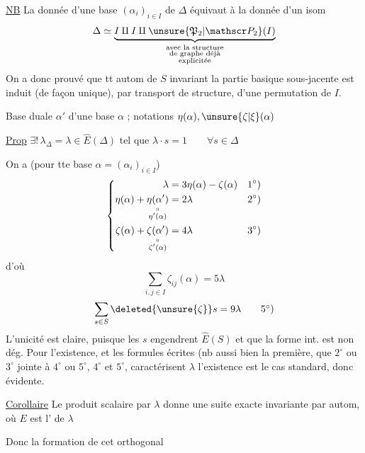 \uline{NB} La donnée d'une base $(\alpha_i)_{i\in I}$ de $\Delta$ équivaut à la donnée d'un isom
\[
\Delta\simeq\underbrace{I\amalg I\amalg\unsure{\mathfrak P_2|\mathscr P_2}(I)}_{\substack{\text{avec la structure}\\\text{de graphe déjà}\\\text{explicitée}}}
\]
On a donc prouvé que tt autom de $S$ invariant  la partie basique sous-jacente est induit (de façon unique), par  transport de structure, d'une permutation de $I$.

Base duale $\alpha'$ d'une base $\alpha$ ; notations $\eta(\alpha),\unsure{\zeta|\xi}(\alpha)$

\uline{Prop} $\exists!\,\lambda_\Delta=\lambda\in\widehat E(\Delta)$ tel que $\boxed{\lambda\cdot s=1\qquad\forall s\in\Delta}$

On a  (pour tte base $\alpha=(\alpha_i)_{i\in I}$)
\[
\left\{\begin{aligned}
\lambda&=3\eta(\alpha)-\zeta(\alpha)&&1^\circ)\\
\eta(\alpha)+\underset{\substack{\shortparallel\\\eta'(\alpha)}}{\eta(\alpha')}&=2\lambda&&2^\circ)\\
\zeta(\alpha)+\underset{\substack{\shortparallel\\\zeta'(\alpha)}}{\zeta(\alpha')}&=4\lambda&&3^\circ)
\end{aligned}\right.
\]
d'où
\[
\sum_{i,j\in I}\zeta_{ij}(\alpha)=5\lambda\tag*{$4^\circ)$}
\]
\[
\sum_{s\in S}\deleted{\unsure{\zeta}}s=9\lambda\tag*{$5^\circ)$}
\]
L'unicité est claire, puisque les $s$  engendrent $\widehat E(S)$ et que la forme int. est non dég. Pour l'existence, et les  formules écrites (nb aussi bien la première, que  $2^\circ$ ou $3^\circ$ jointe à $4^\circ$ ou $5^\circ$,   $4^\circ$ et $5^\circ$, caractérisent $\lambda$\unsure{]|)} l'existence est   le cas standard, donc évidente.

\uline{Corollaire}  \deleted{\unsure{(}} Le produit scalaire par $\lambda$ donne une suite exacte invariante par autom,
où $E$ est l' de $\lambda$

Donc la formation de cet orthogonal

